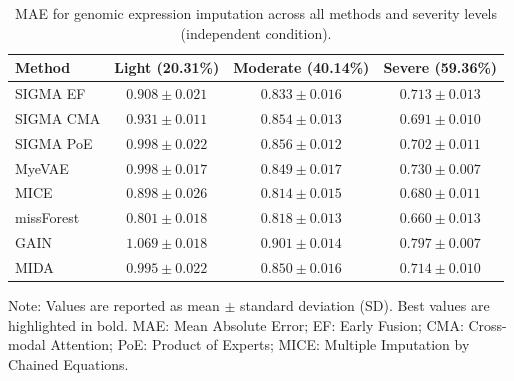 \documentclass[final,3p,times,authoryear]{elsarticle}
\begin{document}
\begin{table}[!t]
\centering
{}
\caption{MAE for genomic expression imputation across all methods and severity levels (independent condition).}
\label{tab:supp_mae_g}
\begin{tabular}{lccc}
\toprule
Method & Light (20.31\%) & Moderate (40.14\%) & Severe (59.36\%) \\
\midrule
SIGMA EF & $0.908 \pm 0.021$ & $0.833 \pm 0.016$ & $0.713 \pm 0.013$ \\
SIGMA CMA & $0.931 \pm 0.011$ & $0.854 \pm 0.013$ & $0.691 \pm 0.010$ \\
SIGMA PoE & $0.998 \pm 0.022$ & $0.856 \pm 0.012$ & $0.702 \pm 0.011$ \\
MyeVAE & $0.998 \pm 0.017$ & $0.849 \pm 0.017$ & $0.730 \pm 0.007$ \\
MICE & $0.898 \pm 0.026$ & $\mathbf{0.814 \pm 0.015}$ & $0.680 \pm 0.011$ \\
missForest & $\mathbf{0.801 \pm 0.018}$ & $0.818 \pm 0.013$ & $\mathbf{0.660 \pm 0.013}$ \\
GAIN & $1.069 \pm 0.018$ & $0.901 \pm 0.014$ & $0.797 \pm 0.007$ \\
MIDA & $0.995 \pm 0.022$ & $0.850 \pm 0.016$ & $0.714 \pm 0.010$ \\
\bottomrule
\end{tabular}

\vspace{1ex}
\footnotesize{Note: Values are reported as mean $\pm$ standard deviation (SD). Best values are highlighted in bold. MAE: Mean Absolute Error; EF: Early Fusion; CMA: Cross-modal Attention; PoE: Product of Experts; MICE: Multiple Imputation by Chained Equations.}
\end{table}
\end{document}
